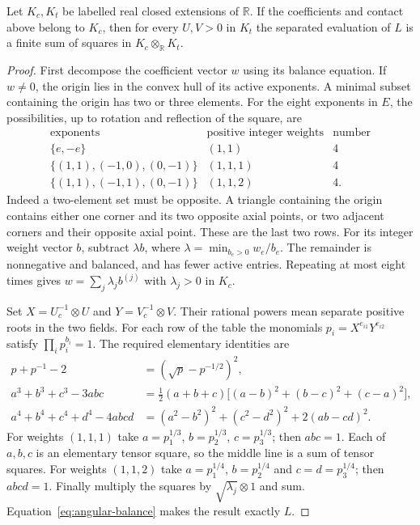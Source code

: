 \begin{lemma}
Let $K_c,K_t$ be labelled real closed extensions of $\mathbb R$.
If the coefficients and contact above belong to $K_c$, then for every
$U,V>0$ in $K_t$ the separated evaluation of $L$ is a finite sum of
squares in $K_c\otimes_{\mathbb R}K_t$.
\end{lemma}
\begin{proof}
First decompose the coefficient vector $w$ using its balance equation.
If $w\ne0$, the origin lies in the convex hull of its active exponents.
A minimal subset containing the origin has two or three elements.
For the eight exponents in $E$, the possibilities, up to rotation
and reflection of the square, are
\[
\begin{array}{c|c|c}
\text{exponents}&\text{positive integer weights}&\text{number}\\ \hline
\{e,-e\}&(1,1)&4\\
\{(1,1),(-1,0),(0,-1)\}&(1,1,1)&4\\
\{(1,1),(-1,1),(0,-1)\}&(1,1,2)&4.
\end{array}
\]
Indeed a two-element set must be opposite. A triangle containing the
origin contains either one corner and its two opposite axial points,
or two adjacent corners and their opposite axial point. These are
the last two rows. For its integer weight vector $b$, subtract
$\lambda b$, where $\lambda=\min_{b_e>0}w_e/b_e$.
The remainder is nonnegative and balanced, and has fewer active
entries. Repeating at most eight times gives
$w=\sum_j\lambda_jb^{(j)}$ with $\lambda_j>0$ in $K_c$.

Set $X=U_c^{-1}\otimes U$ and $Y=V_c^{-1}\otimes V$.
Their rational powers mean separate positive roots in the two fields.
For each row of the table the monomials $p_i=X^{e_{i1}}Y^{e_{i2}}$
satisfy $\prod_i p_i^{b_i}=1$. The required elementary identities are
\begin{align*}
 p+p^{-1}-2&=(\sqrt p-p^{-1/2})^2,\\
 a^3+b^3+c^3-3abc
   &=\tfrac12(a+b+c)\bigl[(a-b)^2+(b-c)^2+(c-a)^2\bigr],\\
 a^4+b^4+c^4+d^4-4abcd
   &=(a^2-b^2)^2+(c^2-d^2)^2+2(ab-cd)^2.
\end{align*}
For weights $(1,1,1)$ take $a=p_1^{1/3}$, $b=p_2^{1/3}$,
$c=p_3^{1/3}$; then $abc=1$. Each of $a,b,c$ is an elementary
tensor square, so the middle line is a sum of tensor squares.
For weights $(1,1,2)$ take $a=p_1^{1/4}$, $b=p_2^{1/4}$ and
$c=d=p_3^{1/4}$; then $abcd=1$.
Finally multiply the squares by $\sqrt{\lambda_j}\otimes1$ and sum.
Equation~\eqref{eq:angular-balance} makes the result exactly $L$.
\end{proof}

